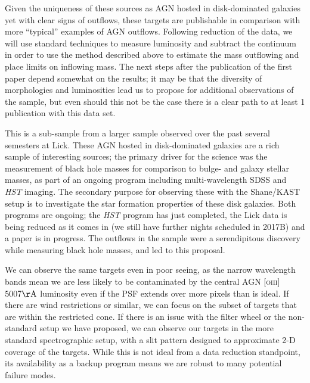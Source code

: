 \documentclass[12pt]{article}
\begin{document}
\vspace{0.25em}


\vspace{0.25em}
Given the uniqueness of these sources as AGN hosted in disk-dominated galaxies yet with clear signs of outflows, these targets are publishable in comparison with more ``typical'' examples of AGN outflows. Following reduction of the data, we will use standard techniques to measure luminosity and subtract the continuum in order to use the method described above to estimate the mass outflowing and place limits on inflowing mass. The next steps after the publication of the first paper depend somewhat on the results; it may be that the diversity of morphologies and luminosities lead us to propose for additional observations of the sample, but even should this not be the case there is a clear path to at least 1 publication with this data set.
\vspace{0.25em}


\vspace{0.25em}
This is a sub-sample from a larger sample observed over the past several semesters at Lick. These AGN hosted in disk-dominated galaxies are a rich sample of interesting sources; the primary driver for the science was the measurement of black hole masses for comparison to bulge- and galaxy stellar masses, as part of an ongoing program including multi-wavelength SDSS and \emph{HST} imaging. The secondary purpose for observing these with the Shane/KAST setup is to investigate the star formation properties of these disk galaxies. Both programs are ongoing; the \emph{HST} program has just completed, the Lick data is being reduced as it comes in (we still have further nights scheduled in 2017B) and a paper is in progress. The outflows in the sample were a serendipitous discovery while measuring black hole masses, and led to this proposal. 
\vspace{0.25em}


\vspace{0.25em}
We can observe the same targets even in poor seeing, as the narrow wavelength bands mean we are less likely to be contaminated by the central AGN \textsc{[oiii]} $5007\rm{\AA}$ luminosity even if the PSF extends over more pixels than is ideal. If there are wind restrictions or similar, we can focus on the subset of targets that are within the restricted cone. If there is an issue with the filter wheel or the non-standard setup we have proposed, we can observe our targets in the more standard spectrographic setup, with a slit pattern designed to approximate 2-D coverage of the targets. While this is not ideal from a data reduction standpoint, its availability as a backup program means we are robust to many potential failure modes. 
\vspace{1.5em}
\end{document}
